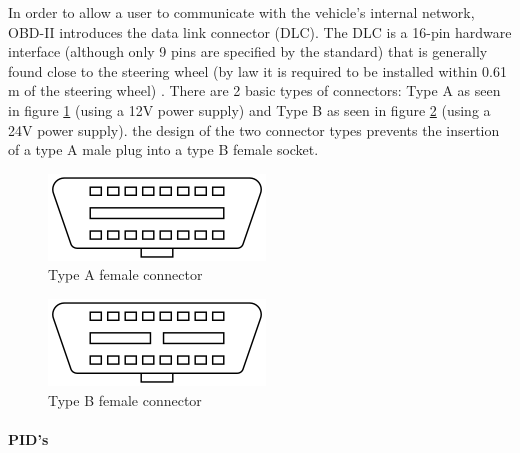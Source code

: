 \documentclass[master=cws,masteroption=vs,english]{kulemt}
\begin{document}
In order to allow a user to communicate with the vehicle's internal network, OBD-II introduces the data link connector (DLC). The DLC is a 16-pin hardware interface (although only 9 pins are specified by the standard) that is generally found close to the steering wheel (by law it is required to be installed within 0.61 m of the steering wheel) \cite{wiki:OBD}. There are 2 basic types of connectors: Type A as seen in figure \ref{fig:typeA} (using a 12V power supply) and Type B as seen in figure \ref{fig:typeB} (using a 24V power supply). the design of the two connector types prevents the insertion of a type A male plug into a type B female socket.

\begin{figure}[h]
	\label{fig:typeA}
	\centering
	\includegraphics{typeA.png}
	\caption{Type A female connector \cite{wiki:OBD}}
\end{figure}

\begin{figure}[h]
	\label{fig:typeB}
	\centering
	\includegraphics{typeB.png}
	\caption{Type B female connector \cite{wiki:OBD}}
\end{figure}

\paragraph{PID's}
\end{document}
